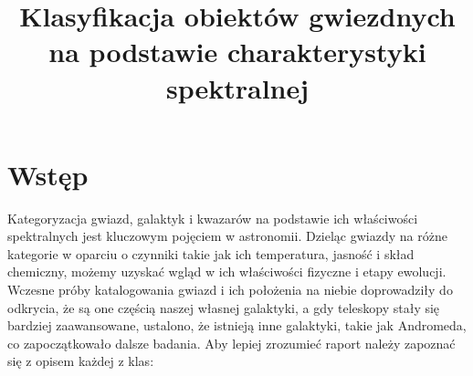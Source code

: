 \documentclass[conference]{IEEEtran}
\author{\IEEEauthorblockN{Michał Klemens, 266883}
\IEEEauthorblockA{Politechnika Wrocławska \\
Informatyka Stosowana\\
5 Czerwiec, 2023}
}
\begin{document}
\title{Klasyfikacja obiektów gwiezdnych na podstawie charakterystyki spektralnej}




\maketitle

\section{Wstęp}
Kategoryzacja gwiazd, galaktyk i kwazarów na podstawie ich właściwości spektralnych jest kluczowym pojęciem w astronomii. Dzieląc gwiazdy na różne kategorie w oparciu o czynniki takie jak ich temperatura, jasność i skład chemiczny, możemy uzyskać wgląd w ich właściwości fizyczne i etapy ewolucji. Wczesne próby katalogowania gwiazd i ich położenia na niebie doprowadziły do odkrycia, że są one częścią naszej własnej galaktyki, a gdy teleskopy stały się bardziej zaawansowane, ustalono, że istnieją inne galaktyki, takie jak Andromeda, co zapoczątkowało dalsze badania.
Aby lepiej zrozumieć raport należy zapoznać się z opisem każdej z klas:
\end{document}
